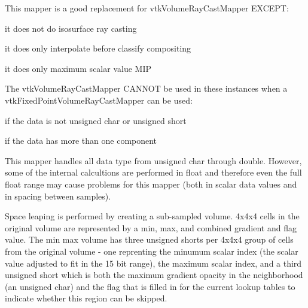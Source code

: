 This mapper is a good replacement for vtk\-Volume\-Ray\-Cast\-Mapper E\-X\-C\-E\-P\-T\-:
\begin{DoxyItemize}
\item it does not do isosurface ray casting
\item it does only interpolate before classify compositing
\item it does only maximum scalar value M\-I\-P
\end{DoxyItemize}

The vtk\-Volume\-Ray\-Cast\-Mapper C\-A\-N\-N\-O\-T be used in these instances when a vtk\-Fixed\-Point\-Volume\-Ray\-Cast\-Mapper can be used\-:
\begin{DoxyItemize}
\item if the data is not unsigned char or unsigned short
\item if the data has more than one component
\end{DoxyItemize}

This mapper handles all data type from unsigned char through double. However, some of the internal calcultions are performed in float and therefore even the full float range may cause problems for this mapper (both in scalar data values and in spacing between samples).

Space leaping is performed by creating a sub-\/sampled volume. 4x4x4 cells in the original volume are represented by a min, max, and combined gradient and flag value. The min max volume has three unsigned shorts per 4x4x4 group of cells from the original volume -\/ one reprenting the minumum scalar index (the scalar value adjusted to fit in the 15 bit range), the maximum scalar index, and a third unsigned short which is both the maximum gradient opacity in the neighborhood (an unsigned char) and the flag that is filled in for the current lookup tables to indicate whether this region can be skipped.

